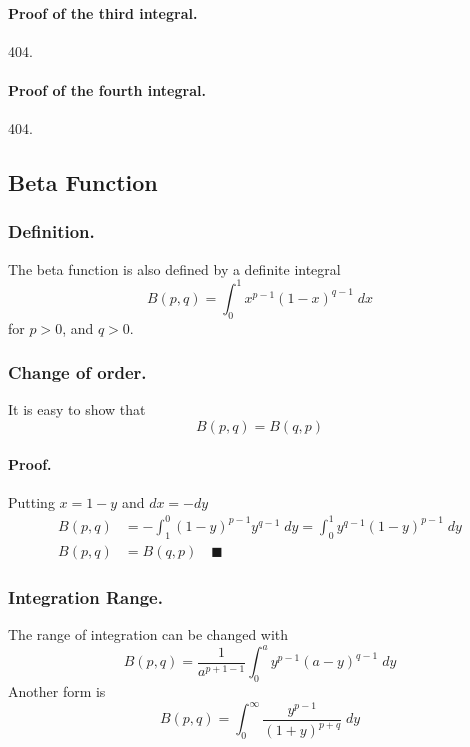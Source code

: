 \documentclass[../../main.tex]{subfiles}
\begin{document}
\paragraph{Proof of the third integral.} 404.
\paragraph{Proof of the fourth integral.} 404. 


\subsection*{Beta Function}
\subsubsection*{Definition.} The beta function is also defined by a definite integral
\begin{equation*}
    B(p,q)=\int_{0}^{1}x^{p-1} (1-x)^{q-1}\;dx 
\end{equation*}
for $p > 0$, and $q > 0$. 

\subsubsection*{Change of order.} It is easy to show that
\begin{equation*}
    B(p,q)=B(q,p)
\end{equation*}

\paragraph{Proof.} Putting $x=1-y$ and $dx=-dy$
\begin{align*}
    B(p,q)&=-\int_{1}^{0}(1-y)^{p-1}y^{q-1}\;dy= \int_{0 }^{1}y^{q-1}(1-y)^{p-1}\;dy\\
    B(p,q)&=B(q,p)\quad\blacksquare
\end{align*}

\subsubsection*{Integration Range.} The range of integration can be changed with 
\begin{equation*}
    B(p,q)=\frac{1}{a^{p+1-1}}  \int_{0}^{a} y^{p-1}(a-y)^{q-1}\;dy 
\end{equation*}
Another form is
\begin{equation*}
    B(p,q)=\int_{0}^{\infty}\frac{y^{p-1}}{(1+y)^{p+q}}\;dy
\end{equation*}
\end{document}
